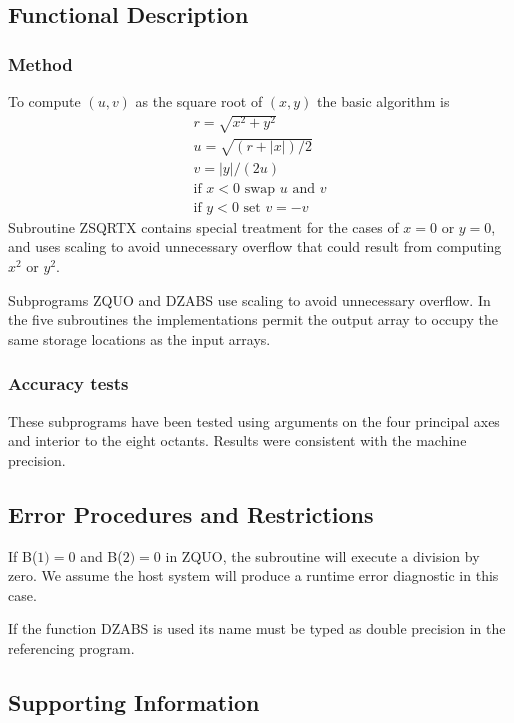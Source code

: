 \documentclass[twoside]{MATH77}
\begin{document}
\subsection{Functional Description}

\subsubsection{Method}

To compute $(u,v)$ as the square root of $(x,y)$ the basic algorithm is
\begin{gather*}
r = \sqrt{x^2 + y^2}\\
u = \sqrt{(r+|x|)/2}\\
v = |y|/(2u)\\
\text{if } x < 0 \text{ swap }u\text{ and }v\\
\text{if } y < 0 \text{ set }v = -v
\end{gather*}
Subroutine ZSQRTX contains special treatment for the cases of $x = 0$ or $y =
0$, and uses scaling to avoid unnecessary overflow that could result from
computing $x^2$ or $y^2.$

Subprograms ZQUO and DZABS use scaling to avoid unnecessary overflow.
In the five subroutines the implementations permit the output array to
occupy the same storage locations as the input arrays.

\subsubsection{Accuracy tests}

These subprograms have been tested using arguments on the four principal
axes and interior to the eight octants. Results were consistent with the
machine precision.

\subsection{Error Procedures and Restrictions}

If B($1) = 0$ and B($2) = 0$ in ZQUO, the subroutine will execute a division
by zero. We assume the host system will produce a runtime error diagnostic
in this case.

If the function DZABS is used its name must be typed as double precision in
the referencing program.

\subsection{Supporting Information}
\end{document}
